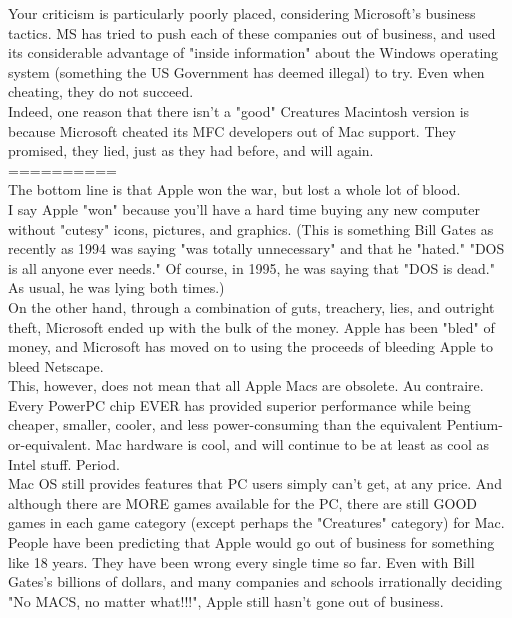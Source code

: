 \documentclass[11pt,twoside,a4paper]{article}
\begin{document}
\begin{multicols*}{2}
Your criticism is particularly poorly placed, considering Microsoft's business tactics. MS has tried to push each of these companies out of business, and used its considerable advantage of "inside information" about the Windows operating system (something the US Government has deemed illegal) to try. Even when cheating, they do not succeed.~\\

Indeed, one reason that there isn't a "good" Creatures Macintosh version is because Microsoft cheated its MFC developers out of Mac support. They promised, they lied, just as they had before, and will again.~\\
==========~\\

The bottom line is that Apple won the war, but lost a whole lot of blood.~\\

I say Apple "won" because you'll have a hard time buying any new computer without "cutesy" icons, pictures, and graphics. (This is something Bill Gates as recently as 1994 was saying "was totally unnecessary" and that he "hated." "DOS is all anyone ever needs." Of course, in 1995, he was saying that "DOS is dead." As usual, he was lying both times.)~\\

On the other hand, through a combination of guts, treachery, lies, and outright theft, Microsoft ended up with the bulk of the money. Apple has been "bled" of money, and Microsoft has moved on to using the proceeds of bleeding Apple to bleed Netscape.~\\

This, however, does not mean that all Apple Macs are obsolete. Au contraire. Every PowerPC chip EVER has provided superior performance while being cheaper, smaller, cooler, and less power-consuming than the equivalent Pentium-or-equivalent. Mac hardware is cool, and will continue to be at least as cool as Intel stuff. Period.~\\

Mac OS still provides features that PC users simply can't get, at any price. And although there are MORE games available for the PC, there are still GOOD games in each game category (except perhaps the "Creatures" category) for Mac.~\\

People have been predicting that Apple would go out of business for something like 18 years. They have been wrong every single time so far. Even with Bill Gates's billions of dollars, and many companies and schools irrationally deciding "No MACS, no matter what!!!", Apple still hasn't gone out of business.~\\


\end{multicols*}
\end{document}
